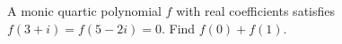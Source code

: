 A monic quartic polynomial $f$ with real coefficients satisfies $f(3+i)=f(5-2i)=0$. Find $f(0)+f(1)$.
